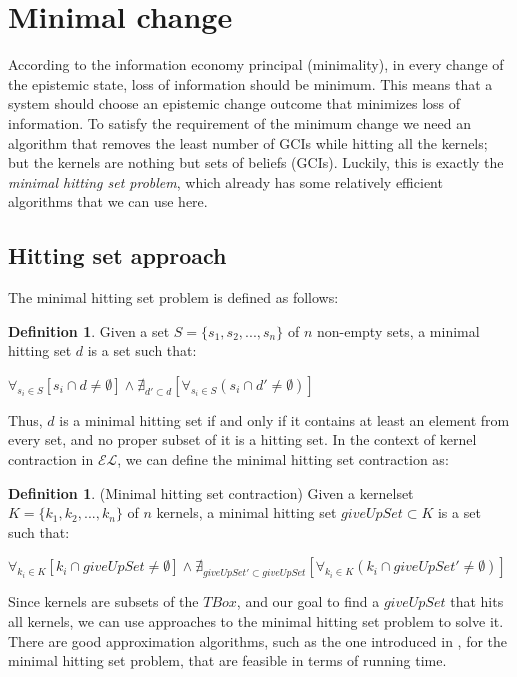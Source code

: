 \documentclass{sfuthesis}
\theoremstyle{plain}
\theoremstyle{definition}
\newtheorem{defn}[thm]{Definition}
\begin{document}
\section{Minimal change}
According to the information economy principal (minimality), in every change of the epistemic state, loss of information should be minimum\cite{econ}. This means that a system should choose an epistemic change outcome that minimizes loss of information. To satisfy the requirement of the minimum change we need an algorithm that removes the least number of GCIs while hitting all the kernels; but the kernels are nothing but sets of beliefs (GCIs). Luckily, this is exactly the \textit{minimal hitting set problem}, which already has some relatively efficient algorithms that we can use here. 

\subsection{Hitting set approach}
The minimal hitting set problem is defined as follows:
\begin{defn}\cite{hit}
Given a set $S=\{s_{1}, s_{2}, ..., s_{n}\}$ of $n$ non-empty sets, a minimal hitting set $d$ is a set such that:
\begin{center}
$\forall_{s_{i} \in S} [ s_{i} \cap d \neq \emptyset] \wedge \nexists_{d' \subset d}[\forall_{s_{i} \in S} (s_{i} \cap d' \neq \emptyset) ]$
\end{center}
\end{defn}

Thus, $d$ is a minimal hitting set if and only if it contains at least an element from every set, and no proper subset of it is a hitting set. In the context of kernel contraction in $\mathcal{EL}$, we can define the minimal hitting set contraction as:
\begin{defn}(Minimal hitting set contraction)
Given a kernelset $K=\{k_{1}, k_{2}, ..., k_{n}\}$ of $n$ kernels, a minimal hitting set $giveUpSet \subset K$ is a set such that:
\begin{center}
$\forall_{k_{i} \in K} [ k_{i} \cap giveUpSet \neq \emptyset] \wedge \nexists_{giveUpSet' \subset giveUpSet}[\forall_{k_{i} \in K} (k_{i} \cap giveUpSet' \neq \emptyset) ]$
\end{center}
\end{defn}

Since kernels are subsets of the $TBox$, and our goal to find a $giveUpSet$ that hits all kernels, we can use approaches to the minimal hitting set problem to solve it. There are good approximation algorithms, such as the one introduced in \cite{hit}, for the minimal hitting set problem, that are feasible in terms of running time. 
\end{document}

